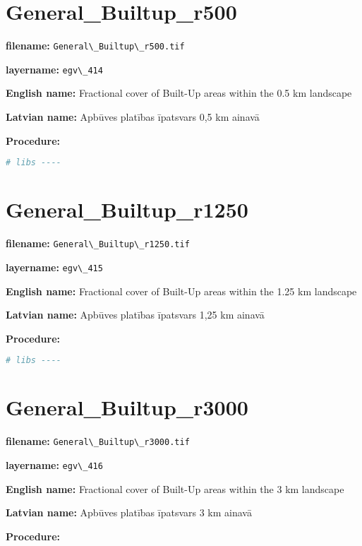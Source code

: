 \documentclass[
]{book}
\newcommand{\passthrough}[1]{#1}
\begin{document}
\section{General\_Builtup\_r500}\label{ch06.414}

\textbf{filename:} \passthrough{\lstinline!General\_Builtup\_r500.tif!}

\textbf{layername:} \passthrough{\lstinline!egv\_414!}

\textbf{English name:} Fractional cover of Built-Up areas within the 0.5 km landscape

\textbf{Latvian name:} Apbūves platības īpatsvars 0,5 km ainavā

\textbf{Procedure:}

\begin{lstlisting}[language=R]
# libs ----
\end{lstlisting}

\section{General\_Builtup\_r1250}\label{ch06.415}

\textbf{filename:} \passthrough{\lstinline!General\_Builtup\_r1250.tif!}

\textbf{layername:} \passthrough{\lstinline!egv\_415!}

\textbf{English name:} Fractional cover of Built-Up areas within the 1.25 km landscape

\textbf{Latvian name:} Apbūves platības īpatsvars 1,25 km ainavā

\textbf{Procedure:}

\begin{lstlisting}[language=R]
# libs ----
\end{lstlisting}

\section{General\_Builtup\_r3000}\label{ch06.416}

\textbf{filename:} \passthrough{\lstinline!General\_Builtup\_r3000.tif!}

\textbf{layername:} \passthrough{\lstinline!egv\_416!}

\textbf{English name:} Fractional cover of Built-Up areas within the 3 km landscape

\textbf{Latvian name:} Apbūves platības īpatsvars 3 km ainavā

\textbf{Procedure:}
\end{document}

